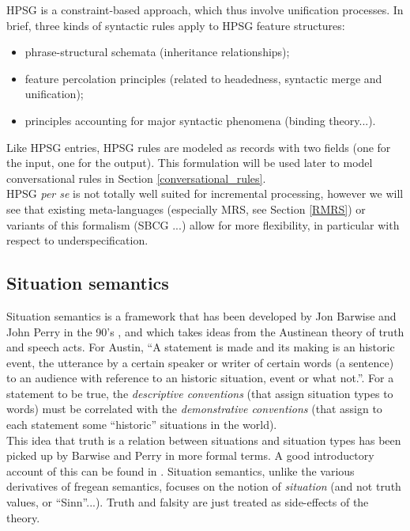\documentclass[11pt]{article}
\begin{document}
				HPSG is a constraint-based approach, which thus involve unification processes. In brief, three kinds of syntactic rules apply to HPSG feature structures:
				\begin{itemize}
					\item phrase-structural schemata (inheritance relationships);\vspace{-2mm}
					\item feature percolation principles (related to headedness, syntactic merge and unification);\vspace{-2mm}
					\item principles accounting for major syntactic phenomena (binding theory...).
				\end{itemize}
				Like HPSG entries, HPSG rules are modeled as records with two fields (one for the input, one for the output). This formulation will be used later to model conversational rules in Section \ref{conversational_rules}.\\
				
				HPSG \textit{per se} is not totally well suited for incremental processing, however we will see that existing meta-languages (especially MRS, see Section \ref{RMRS}) or variants of this formalism (SBCG \cite{sag2015}...) allow for more flexibility, in particular with respect to underspecification.
			
		\subsection{Situation semantics}
			Situation semantics is a framework that has been developed by Jon Barwise and John Perry in the 90's \cite{barwise1998}, and which takes ideas from the Austinean theory of truth and speech acts. For Austin, ``A statement is made and its making is an historic event, the utterance by a certain speaker or writer of certain words (a sentence) to an audience with reference to an historic situation, event or what not.''. For a statement to be true, the \textit{descriptive conventions} (that assign situation types to words) must be correlated with the \textit{demonstrative conventions} (that assign to each statement some ``historic'' situations in the world).\\
			
			This idea that truth is a relation between situations and situation types has been picked up by Barwise and Perry in more formal terms. A good introductory account of this can be found in \cite{stojanovic2011}. Situation semantics, unlike the various derivatives of fregean semantics, focuses on the notion of \textit{situation} (and not truth values, or ``Sinn''...). Truth and falsity are just treated as side-effects of the theory.\\
			
\end{document}
